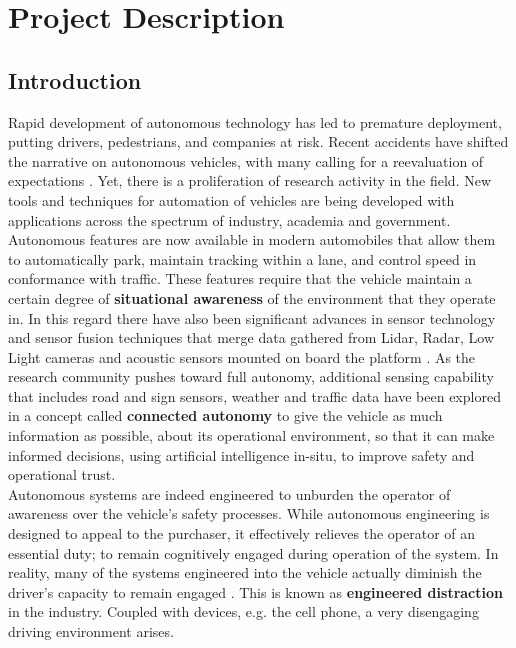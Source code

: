 \section{Project Description}
\subsection{Introduction}
Rapid development of autonomous technology has led to premature deployment, putting drivers, pedestrians, and companies at risk.  Recent accidents have shifted the narrative on autonomous vehicles, with many calling for a reevaluation of expectations 
\cite{Wakabayashi2019,Dickson2019,Higgins2019}.
Yet, there is a proliferation of research activity in the field. New tools and techniques for automation of vehicles are being developed with applications across the spectrum of industry, academia and government. Autonomous features are now available in modern automobiles that allow them to automatically park, maintain tracking within a lane, and control speed in conformance with traffic. These features require that the vehicle maintain a certain degree of
\textbf{situational awareness} of the environment that they operate in. In this regard there have also been significant advances in sensor technology and sensor fusion techniques that merge data gathered from Lidar, Radar, Low Light cameras and acoustic sensors mounted on board the platform
\cite{Liu2018,Ingrand2017}.
As the research community pushes toward full autonomy, additional sensing capability that includes road and sign sensors, weather and traffic data have been explored in a concept called \textbf{connected autonomy} to give the vehicle as much information as possible, about its operational environment, so that it can make informed decisions, using artificial intelligence in-situ, to improve safety and operational trust.\\

Autonomous systems are indeed engineered to unburden the operator of awareness over the vehicle's safety processes. While autonomous engineering is designed to appeal to the purchaser, it effectively relieves the operator of an essential duty; to remain cognitively engaged during operation of the system. In reality, many of the systems engineered into the vehicle actually diminish the driver's capacity to remain engaged \cite{Cunningham2015}. This is known as 
\textbf{engineered distraction} in the industry. Coupled with devices, e.g. the cell phone, a very disengaging driving environment arises.\\

